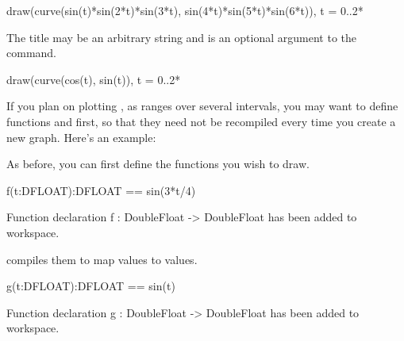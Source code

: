 \begin{psXtc}
\begin{spadsrc}
draw(curve(sin(t)*sin(2*t)*sin(3*t), sin(4*t)*sin(5*t)*sin(6*t)), t = 0..2*%
\end{spadsrc}
\end{psXtc}
%
%
\begin{psXtc}
\begin{xtccomment}
The title may be an arbitrary string and is an
optional argument to the  command.
\end{xtccomment}
\begin{spadsrc}
draw(curve(cos(t), sin(t)), t = 0..2*%
\end{spadsrc}
\end{psXtc}
%
If you plan on plotting ,  as  ranges over
several intervals, you may want to define functions  and  first, so
that they need not be recompiled every time you create a new graph.
Here's an example:
\begin{xtc}
\begin{xtccomment}
As before, you can first define the functions you wish to draw.
\end{xtccomment}
\begin{spadsrc}
f(t:DFLOAT):DFLOAT == sin(3*t/4) 
\end{spadsrc}
\begin{MessageOutput}
   Function declaration f : DoubleFloat -> DoubleFloat has been added 
      to workspace.
\end{MessageOutput}
\end{xtc}
\begin{xtc}
\begin{xtccomment}
\Language{} compiles them to map 
values to  values.
\end{xtccomment}
\begin{spadsrc}
g(t:DFLOAT):DFLOAT == sin(t) 
\end{spadsrc}
\begin{MessageOutput}
   Function declaration g : DoubleFloat -> DoubleFloat has been added 
      to workspace.
\end{MessageOutput}
\end{xtc}


